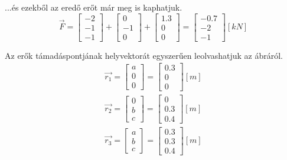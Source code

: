 \break

...és ezekből az eredő erőt már meg is kaphatjuk. 
$$
\vec{F} = 
\begin{bmatrix} -2 \\ -1 \\ -1 \end{bmatrix} + 
\begin{bmatrix} 0 \\ -1 \\ 0 \end{bmatrix} + 
\begin{bmatrix} 1.3 \\ 0 \\ 0 \end{bmatrix}
= \begin{bmatrix} -0.7 \\ -2 \\ -1 \end{bmatrix} [\si{kN}]
$$

Az erők támadáspontjának helyvektorát egyszerűen leolvashatjuk az ábráról.
\begin{gather}
	\vec{r_1} = \begin{bmatrix} a \\ 0 \\ 0 \end{bmatrix} = \begin{bmatrix} 0.3 \\ 0 \\ 0 \end{bmatrix} [\si{m}] \\
\vec{r_2} = \begin{bmatrix} 0 \\ b \\ c \end{bmatrix} = \begin{bmatrix} 0 \\ 0.3 \\ 0.4 \end{bmatrix} [\si{m}] \\
\vec{r_3} = \begin{bmatrix} a \\ b \\ c \end{bmatrix} = \begin{bmatrix} 0.3 \\ 0.3 \\ 0.4 \end{bmatrix} [\si{m}]
\end{gather}

